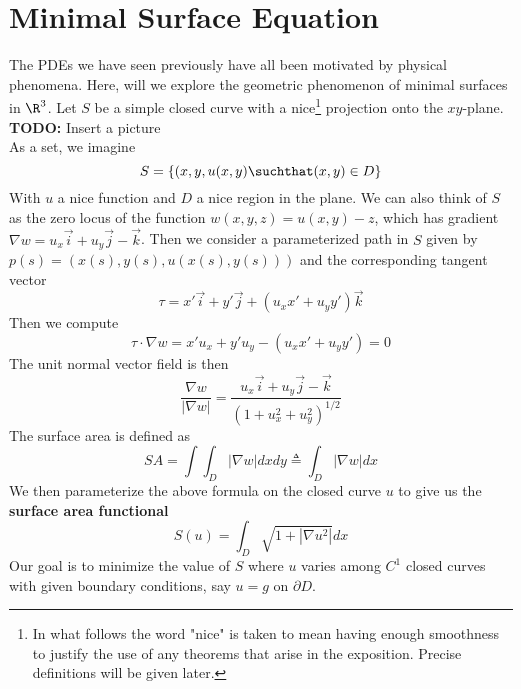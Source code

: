 \documentclass{bkcnotes}
\newcommand{\todo}[1]{{\bf TODO: } #1\\}
\begin{document}
\maketitle

\section{Minimal Surface Equation}
The PDEs we have seen previously have all been motivated by physical
phenomena. Here, will we explore the geometric phenomenon of minimal
surfaces in $\R^3$. Let $S$ be a simple closed curve with a
nice\footnote{In what follows the word "nice" is taken to mean having
  enough smoothness to justify the use of any theorems that arise in
  the exposition. Precise definitions will be given later. } projection
onto the $xy$-plane.
\todo{Insert a picture}
As a set, we imagine
\[
S = \left\{(x,y,u(x,y) \suchthat (x,y) \in D \right\}
\]
With $u$ a nice function and $D$ a nice region in the plane. We can
also think of $S$ as the zero locus of the function $w(x,y,z) = u(x,y)
- z$, which has gradient $\nabla w = u_x \vec{i} + u_y\vec{j} -
\vec{k}$. Then we consider a parameterized path in $S$ given by $p(s)
= (x(s), y(s), u(x(s),y(s)))$ and the corresponding tangent vector
\[
\tau = x'\vec{i} + y'\vec{j} + (u_xx' + u_yy')\vec{k}
\]
Then we compute
\[
\tau \cdot \nabla w = x'u_x + y'u_y - (u_xx' + u_yy') = 0
\]
The unit normal vector field is then
\[
\frac{\nabla w}{|\nabla w|} = \frac{u_x\vec{i} + u_y\vec{j}
  -\vec{k}}{(1+u_x^2+u_y^2)^{1/2}}
\]
The surface area is defined as
\[
SA = \int\int_D |\nabla w|dxdy \triangleq \int_D |\nabla w|dx
\]
We then parameterize the above formula on the closed curve $u$ to give
us the \textbf{surface area functional}
\begin{equation}
  \label{eq:minimal-surface}
  S(u) = \int_D \sqrt{1 + |\nabla u^2|}dx
\end{equation}
Our goal is to minimize the value of $S$ where $u$ varies among $C^1$
closed curves with given boundary conditions, say $u = g$ on $\partial
D$.
\end{document}
